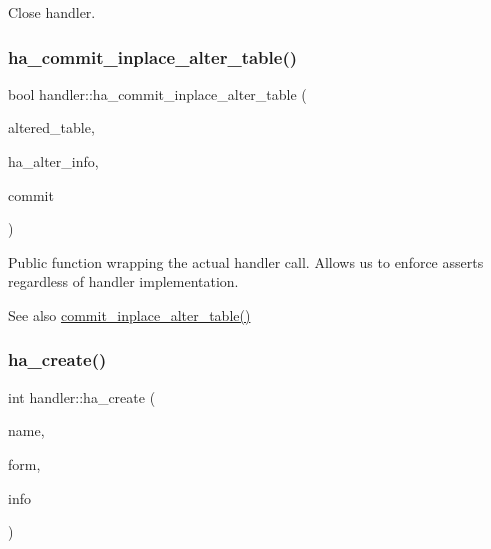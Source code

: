 Close handler. \mbox{\label{classhandler_a6ec170a4aa71186f9dc17358b55587c7}} 
\subsubsection{\texorpdfstring{ha\+\_\+commit\+\_\+inplace\+\_\+alter\+\_\+table()}{ha\_commit\_inplace\_alter\_table()}}
{\footnotesize\ttfamily bool handler\+::ha\+\_\+commit\+\_\+inplace\+\_\+alter\+\_\+table (\begin{DoxyParamCaption}\item[{\mbox{\hyperlink{structTABLE}{T\+A\+B\+LE}} $\ast$}]{altered\+\_\+table,  }\item[{\mbox{\hyperlink{classAlter__inplace__info}{Alter\+\_\+inplace\+\_\+info}} $\ast$}]{ha\+\_\+alter\+\_\+info,  }\item[{bool}]{commit }\end{DoxyParamCaption})}

Public function wrapping the actual handler call. Allows us to enforce asserts regardless of handler implementation. \begin{DoxySeeAlso}{See also}
\mbox{\hyperlink{classhandler_a0786a5f57ccd3c97bff07b1afeae9c06}{commit\+\_\+inplace\+\_\+alter\+\_\+table()}} 
\end{DoxySeeAlso}
\mbox{\label{classhandler_a14af5825a427ba6baac74b13223637f8}} 
\subsubsection{\texorpdfstring{ha\+\_\+create()}{ha\_create()}}
{\footnotesize\ttfamily int handler\+::ha\+\_\+create (\begin{DoxyParamCaption}\item[{const char $\ast$}]{name,  }\item[{\mbox{\hyperlink{structTABLE}{T\+A\+B\+LE}} $\ast$}]{form,  }\item[{\mbox{\hyperlink{structst__ha__create__information}{H\+A\+\_\+\+C\+R\+E\+A\+T\+E\+\_\+\+I\+N\+FO}} $\ast$}]{info }\end{DoxyParamCaption})}

